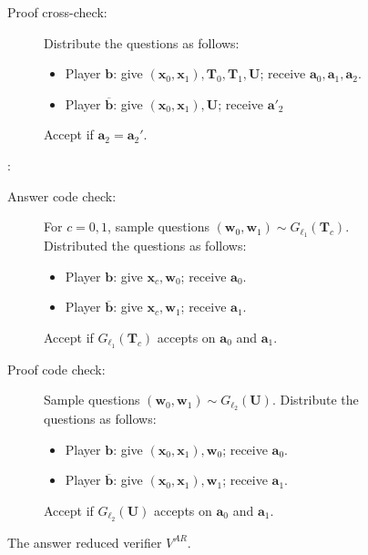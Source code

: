 \documentclass[11pt]{article}
\theoremstyle{plain}
\theoremstyle{definition}
\newenvironment{Algorithm}{\begin{framed}}{\end{framed}}
\newcommand{\1}{\mathbb{1}} %
\newcommand{\ba}{\pmb{a}}
\newcommand{\bb}{\pmb{b}}
\newcommand{\bw}{\pmb{w}}
\newcommand{\bx}{\pmb{x}}
\newcommand{\bT}{\pmb{T}}
\newcommand{\bU}{\pmb{U}}
\begin{document}
\begin{figure}
\begin{center}
{\begin{minipage}{0.9\linewidth}
\begin{Algorithm}
\begin{description}
\begin{description}
    		\item[Proof cross-check:] Distribute the questions as follows:
    		\begin{itemize}
    		\item
    		Player $\bb$: give $(\bx_0, \bx_1), \bT_0, \bT_1, \bU$; receive $\ba_0, \ba_1, \ba_2$.
    		\item
    		Player $\overline{\bb}$: give $(\bx_0, \bx_1), \bU$; receive $\ba'_2$
    		\end{itemize}
    		Accept if $\ba_2 = \ba_2'$.
    	\end{description}
    	\item[Code checks]:
    	\begin{description}
    		\item[Answer code check:] For $c=0,1$, 
    		sample questions $(\bw_0, \bw_1) \sim G_{\ell_1}(\bT_{c})$.
    		Distributed the questions as follows:
    		\begin{itemize}
    		\item
    		Player $\bb$: give $\bx_{c}, \bw_0$; receive $\ba_0$.
    		\item
    		Player $\overline{\bb}$: give $\bx_{c}, \bw_1$; receive $\ba_1$.
    		\end{itemize}
    		Accept if $G_{\ell_1}(\bT_{c})$ accepts on $\ba_0$ and $\ba_1$.
    		\item[Proof code check:] 
    		Sample questions $(\bw_0, \bw_1) \sim G_{\ell_2}(\bU)$.
    		Distribute the questions as follows:
    		\begin{itemize}
    		\item
    		Player $\bb$: give $(\bx_0, \bx_1), \bw_0$; receive $\ba_0$.
    		\item
    		Player $\overline{\bb}$: give $(\bx_0, \bx_1), \bw_1$; receive $\ba_1$.
    		\end{itemize}
    		Accept if $G_{\ell_2}(\bU)$ accepts on $\ba_0$ and $\ba_1$.
    	\end{description}
    \end{description}
    \end{Algorithm}
    \caption{The answer reduced verifier $V^{AR}$.}
    \end{minipage}
    }
     \end{center}
     \label{fig:VAR}
 \end{figure}
\end{document}
